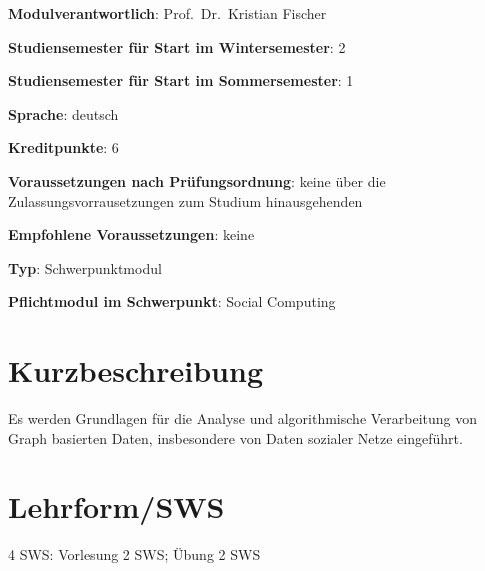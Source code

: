 \begin{modulHead}
\textbf{Modulverantwortlich}: Prof.~Dr.~Kristian
Fischer
\end{modulHead}
\begin{modulHead}
\textbf{Studiensemester für
Start im Wintersemester}:
2
\end{modulHead}
\begin{modulHead}
\textbf{Studiensemester für Start
im Sommersemester}:
1
\end{modulHead}
\begin{modulHead}
\textbf{Sprache}:
deutsch
\end{modulHead}
\begin{modulHead}
\textbf{Kreditpunkte}:
6
\end{modulHead}
\begin{modulHead}
\textbf{Voraussetzungen nach
Prüfungsordnung}: keine über die Zulassungsvorrausetzungen zum Studium
hinausgehenden
\end{modulHead}
\begin{modulHead}
\textbf{Empfohlene
Voraussetzungen}: keine
\end{modulHead}
\begin{modulHead}
\textbf{Typ}:
Schwerpunktmodul
\end{modulHead}
\begin{modulHead}
\textbf{Pflichtmodul
im Schwerpunkt}: Social Computing
\end{modulHead}


\section*{Kurzbeschreibung\label{/mi-2017/modulbeschreibungen-master/MA_SC_Modul_Netzwerk--und-Graphentheorie}}\label{kurzbeschreibungpathlabelmi-2017modulbeschreibungen-mastermaux5fscux5fmodulux5fnetzwerkund-graphentheorie}

Es werden Grundlagen für die Analyse und algorithmische Verarbeitung von
Graph basierten Daten, insbesondere von Daten sozialer Netze eingeführt.

\section*{Lehrform/SWS
\label{/mi-2017/modulbeschreibungen-master/MA_SC_Modul_Netzwerk--und-Graphentheorie}}\label{lehrformsws-pathlabelmi-2017modulbeschreibungen-mastermaux5fscux5fmodulux5fnetzwerkund-graphentheorie}

4 SWS: Vorlesung 2 SWS; Übung 2 SWS

